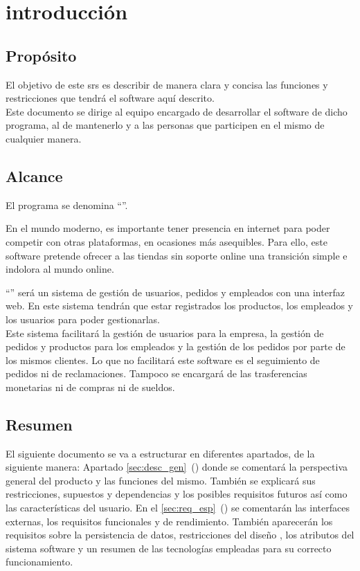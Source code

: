 \section{introducción}
\subsection{Propósito}
El objetivo de este \gls{srs} es describir de manera clara y concisa las funciones y restricciones que tendrá el software aquí descrito.\\
Este documento se dirige al equipo encargado de desarrollar el software de dicho programa, al de mantenerlo y a las personas que participen en el mismo de cualquier manera.
\subsection{Alcance}
El programa se denomina ``\nombredelproyecto''.

En el mundo moderno, es importante tener presencia en internet para poder competir con otras plataformas, en ocasiones más asequibles. Para ello, este software pretende ofrecer a las tiendas sin soporte online una transición simple e indolora al mundo online.

``\nombredelproyecto'' será un sistema de gestión de usuarios, pedidos y empleados con una interfaz web. En este sistema tendrán que estar registrados los productos, los empleados y los usuarios para poder gestionarlas.\\
Este sistema facilitará la gestión de usuarios para la empresa, la gestión de pedidos y productos para los empleados y la gestión de los pedidos por parte de los mismos clientes.
Lo que no facilitará este software es el seguimiento de pedidos ni de reclamaciones. Tampoco se encargará de las trasferencias monetarias ni de compras ni de sueldos.

\glsaddall
\nocite{*}
{
    \printglossary[title=Definiciones\, acrónimos y abreviaturas, numberedsection]}





\subsection{Resumen}
El siguiente documento se va a estructurar en diferentes apartados, de la siguiente manera: Apartado \ref{sec:desc_gen}~() donde se comentará la perspectiva general del producto y las funciones del mismo. También se explicará sus restricciones, supuestos y dependencias y los posibles requisitos futuros así como las características del usuario.
En el \ref{sec:req_esp}~() se comentarán las interfaces externas, los requisitos funcionales y de rendimiento. También aparecerán los requisitos sobre la persistencia de datos, restricciones del diseño , los atributos del sistema software y un resumen de las tecnologías empleadas para su correcto funcionamiento.
